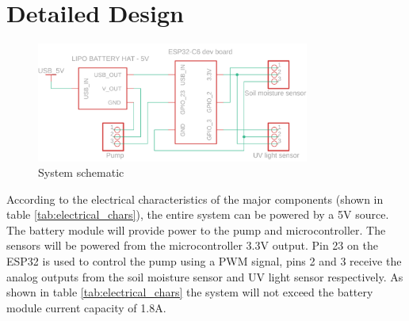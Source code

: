 \graphicspath{{detail_design/fig/}}

\chapter{Detailed Design}
\label{chap:detail_design}

\begin{figure}[!h]
    \centering
    \includegraphics[width= 0.8\textwidth]{Report/detail_design/fig/detail_schematic.png}
    \caption{System schematic}
    \label{fig:detail_schematic}
\end{figure}

According to the electrical characteristics of the major components (shown in table \ref{tab:electrical_chars}), the entire system can be powered by a 5V source. The battery module will provide power to the pump and microcontroller. The sensors will be powered from the microcontroller 3.3V output. Pin 23 on the ESP32 is used to control the pump using a PWM signal, pins 2 and 3 receive the analog outputs from the soil moisture sensor and UV light sensor respectively. As shown in table \ref{tab:electrical_chars} the system will not exceed the battery module current capacity of 1.8A.

